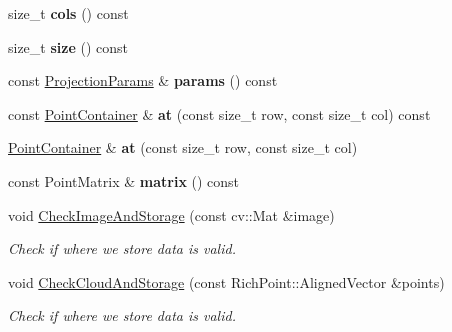 \begin{DoxyCompactItemize}
\mbox{\label{classdepth__clustering_1_1CloudProjection_a6f5be6a4cd14c458a0eb020d9573d17c}} 
size\+\_\+t {\bfseries cols} () const
\item 
\mbox{\label{classdepth__clustering_1_1CloudProjection_a2973d1a5e364ecbd2ae8838dbccfc59b}} 
size\+\_\+t {\bfseries size} () const
\item 
\mbox{\label{classdepth__clustering_1_1CloudProjection_a6afd8a8c752e19705c62d96b35ae61d0}} 
const \hyperlink{classdepth__clustering_1_1ProjectionParams}{Projection\+Params} \& {\bfseries params} () const
\item 
\mbox{\label{classdepth__clustering_1_1CloudProjection_ad452c4ae44f413d19a6bbb0210483152}} 
const \hyperlink{classdepth__clustering_1_1CloudProjection_1_1PointContainer}{Point\+Container} \& {\bfseries at} (const size\+\_\+t row, const size\+\_\+t col) const
\item 
\mbox{\label{classdepth__clustering_1_1CloudProjection_a72001e572391d9fba69f2572ac6369f5}} 
\hyperlink{classdepth__clustering_1_1CloudProjection_1_1PointContainer}{Point\+Container} \& {\bfseries at} (const size\+\_\+t row, const size\+\_\+t col)
\item 
\mbox{\label{classdepth__clustering_1_1CloudProjection_a3806044cabf6286a5b66f1a3b295009f}} 
const Point\+Matrix \& {\bfseries matrix} () const
\item 
void \hyperlink{classdepth__clustering_1_1CloudProjection_ad92d5819092ef3e4aabd4da3a5775f38}{Check\+Image\+And\+Storage} (const cv\+::\+Mat \&image)
\begin{DoxyCompactList}\small\item\em Check if where we store data is valid. \end{DoxyCompactList}\item 
void \hyperlink{classdepth__clustering_1_1CloudProjection_a3bd71fd09ce42208b793d763637a527b}{Check\+Cloud\+And\+Storage} (const Rich\+Point\+::\+Aligned\+Vector \&points)
\begin{DoxyCompactList}\small\item\em Check if where we store data is valid. \end{DoxyCompactList}\item 

\end{DoxyCompactItemize}
